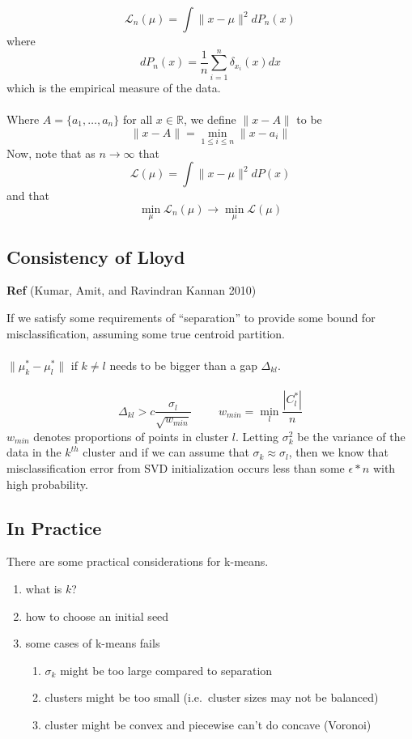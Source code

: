 \documentclass[12pt]{article}
\theoremstyle{plain}
\begin{document}
\[
\mathcal{L}_n (\mu) = \int \| x - \mu \|^2 d P_n(x)
\]
where
\[
d P_n (x) = \frac{1}{n} \sum_{i = 1}^n \delta_{x_i} (x) dx
\]
which is the empirical measure of the data.
\\ \\
Where $ A = \{ a_1, \ldots, a_n \} $ for all $ x \in \mathbb{R} $, we define $ \| x - A \| $ to be
\[
\| x - A \| = \min_{1 \leq i \leq n} \| x - a_i \|
\]
Now, note that as $ n \to \infty $ that
\[
\mathcal{L} (\mu) = \int \| x - \mu \|^2 dP(x)
\]
and that
\[
\min_{\mu} \mathcal{L}_n (\mu) \to \min_{\mu} \mathcal{L} (\mu)
\]

\subsection{Consistency of Lloyd}
\label{subsec:consistency}

\textbf{Ref} (Kumar, Amit, and Ravindran Kannan 2010)

If we satisfy some requirements of ``separation'' to provide some bound for misclassification, assuming some true centroid partition.
\\ \\
$ \| \mu^{*}_{k} - \mu^{*}_{l} \| $ if $ k \neq l $ needs to be bigger than a gap $ \Delta_{kl} $.
\\ \\
\[
\Delta_{kl} > c \frac{\sigma_l}{\sqrt{w_{min}}} \hspace{1cm} w_{min} = \min_{l} \frac{|C_l^{*}|}{n}
\]
$w_{min}$ denotes proportions of points in cluster $l$. Letting $ \sigma_k^2 $ be the variance of the data in the $ k^{th} $ cluster and if we can assume that $ \sigma_k \approx \sigma_l $, then we know that misclassification error from SVD initialization occurs less than some $ \epsilon * n $ with high probability.

\subsection{In Practice}
\label{subsec:inpractice}

There are some practical considerations for k-means.
\begin{enumerate}
  \item what is $ k $?
  \item how to choose an initial seed
  \item some cases of k-means fails
  \begin{enumerate}
    \item $ \sigma_k $ might be too large compared to separation
    \item clusters might be too small (i.e.\ cluster sizes may not be balanced)
    \item cluster might be convex and piecewise can't do concave (Voronoi)
  \end{enumerate}
\end{enumerate}
\end{document}
